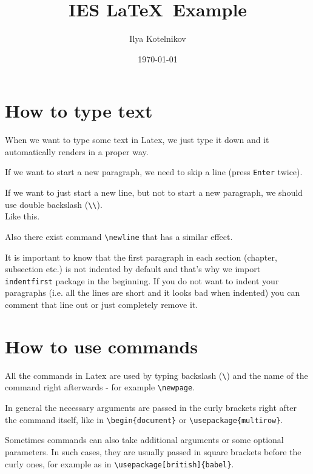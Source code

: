 \documentclass[a4paper, 12pt]{article}
\title{IES \LaTeX\ Example}
\author{Ilya Kotelnikov}
\date{\today}
\begin{document}


\setcounter{page}{1}

\maketitle

\begin{abstract}
    \lipsum[1-1]
\end{abstract}

\newpage

\tableofcontents

\newpage

\section{How to type text}
When we want to type some text in Latex, we just type it down and it automatically renders in a proper way.

If we want to start a new paragraph, we need to skip a line (press \verb|Enter| twice).

If we want to just start a new line, but not to start a new paragraph, we should use double backslash (\verb|\\|).\\
Like this.

Also there exist command \verb|\newline| that has a similar effect.

It is important to know that the first paragraph in each section (chapter, subsection etc.) is not indented by default and that's why we import \verb|indentfirst| package in the beginning. If you do not want to indent your paragraphs (i.e. all the lines are short and it looks bad when indented) you can comment that line out or just completely remove it.
\section{How to use commands}
All the commands in Latex are used by typing backslash (\verb|\|) and the name of the command right afterwards - for example \verb|\newpage|.

In general the necessary arguments are passed in the curly brackets right after the command itself, like in \verb|\begin{document}| or \verb|\usepackage{multirow}|. 

Sometimes commands can also take additional arguments or some optional parameters. In such cases, they are usually passed in square brackets before the curly ones, for example as in \verb|\usepackage[british]{babel}|.
\end{document}
